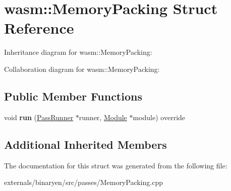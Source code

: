 \hypertarget{structwasm_1_1_memory_packing}{}\section{wasm\+:\+:Memory\+Packing Struct Reference}
\label{structwasm_1_1_memory_packing}


Inheritance diagram for wasm\+:\+:Memory\+Packing\+:


Collaboration diagram for wasm\+:\+:Memory\+Packing\+:
\subsection*{Public Member Functions}
\begin{DoxyCompactItemize}
\item 
\mbox{\label{structwasm_1_1_memory_packing_a88cdecfe2d0434a620392fca260c2135}} 
void {\bfseries run} (\mbox{\hyperlink{structwasm_1_1_pass_runner}{Pass\+Runner}} $\ast$runner, \mbox{\hyperlink{classwasm_1_1_module}{Module}} $\ast$module) override
\end{DoxyCompactItemize}
\subsection*{Additional Inherited Members}


The documentation for this struct was generated from the following file\+:\begin{DoxyCompactItemize}
\item 
externals/binaryen/src/passes/Memory\+Packing.\+cpp\end{DoxyCompactItemize}
